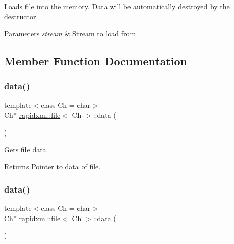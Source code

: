 Loads file into the memory. Data will be automatically destroyed by the destructor 
\begin{DoxyParams}{Parameters}
{\em stream} & Stream to load from \\
\hline
\end{DoxyParams}


\subsection{Member Function Documentation}
\mbox{\label{classrapidxml_1_1file_af1c71d65862c7af14e4708e32a80c1de}} 
\subsubsection{\texorpdfstring{data()}{data()}\hspace{0.1cm}{\footnotesize\ttfamily [1/4]}}
{\footnotesize\ttfamily template$<$class Ch  = char$>$ \\
Ch$\ast$ \mbox{\hyperlink{classrapidxml_1_1file}{rapidxml\+::file}}$<$ Ch $>$\+::data (\begin{DoxyParamCaption}{ }\end{DoxyParamCaption})\hspace{0.3cm}{\ttfamily [inline]}}

Gets file data. \begin{DoxyReturn}{Returns}
Pointer to data of file. 
\end{DoxyReturn}
\mbox{\label{classrapidxml_1_1file_af1c71d65862c7af14e4708e32a80c1de}} 
\subsubsection{\texorpdfstring{data()}{data()}\hspace{0.1cm}{\footnotesize\ttfamily [2/4]}}
{\footnotesize\ttfamily template$<$class Ch  = char$>$ \\
Ch$\ast$ \mbox{\hyperlink{classrapidxml_1_1file}{rapidxml\+::file}}$<$ Ch $>$\+::data (\begin{DoxyParamCaption}{ }\end{DoxyParamCaption})\hspace{0.3cm}{\ttfamily [inline]}}

